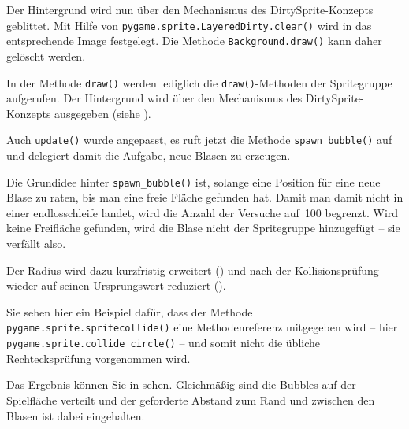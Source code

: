 Der Hintergrund wird nun über den Mechanismus des DirtySprite-Konzepts geblittet. Mit Hilfe von \texttt{pygame.sprite.LayeredDirty.clear()} wird in  das entsprechende Image festgelegt. Die Methode \texttt{Background.draw()} kann daher gelöscht werden.


In der Methode \texttt{draw()} werden lediglich die \texttt{draw()}-Methoden der Spritegruppe aufgerufen. Der Hintergrund wird über den Mechanismus des DirtySprite-Konzepts ausgegeben (siehe ). 

Auch \texttt{update()} wurde angepasst, es ruft jetzt die Methode \texttt{spawn\_bubble()} auf und delegiert damit die Aufgabe, neue Blasen zu erzeugen.


Die Grundidee hinter \texttt{spawn\_bubble()} ist, solange eine Position für eine neue Blase zu raten, bis man eine freie Fläche gefunden hat. Damit man damit nicht in einer \Gls{endlosschleife} landet, wird die Anzahl der Versuche auf~100 begrenzt. Wird keine Freifläche gefunden, wird die Blase nicht der Spritegruppe hinzugefügt -- sie verfällt also. 

Der Radius wird dazu kurzfristig erweitert () und nach der Kollisionsprüfung wieder auf seinen Ursprungswert reduziert (). 

Sie sehen hier ein Beispiel dafür, dass der Methode \texttt{pygame.sprite.spritecollide()} eine Methodenreferenz mitgegeben wird -- hier \texttt{pygame.sprite.collide\_circle()} --  und somit nicht die übliche Rechtecksprüfung vorgenommen wird.


Das Ergebnis können Sie in  sehen. Gleichmäßig sind die Bubbles auf der Spielfläche verteilt und der geforderte Abstand zum Rand und zwischen den Blasen ist dabei eingehalten.

